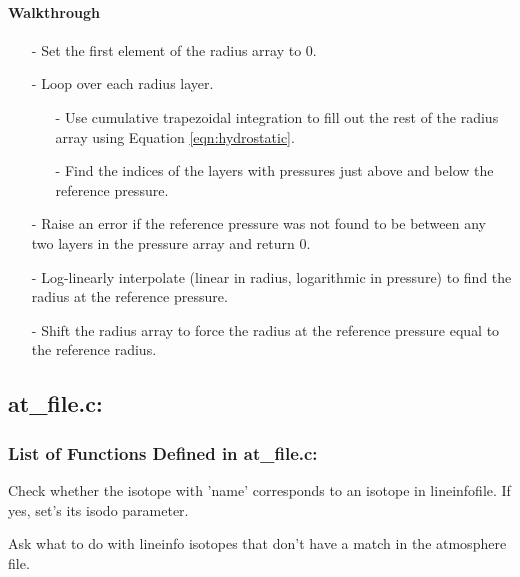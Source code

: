 \documentclass[letterpaper,12pt]{article}
\begin{document}
\paragraph{Walkthrough}
\begin{enumerate}[leftmargin=10pt, noitemsep, parsep=0pt, topsep=0ex]
\item[-] Set the first element of the radius array to 0.
\item[-] Loop over each radius layer.
\begin{enumerate}[leftmargin=10pt, noitemsep, parsep=0pt, topsep=0ex]
\item[-] Use cumulative trapezoidal integration to fill out the rest of the radius array using Equation \ref{eqn:hydrostatic}.
\item[-] Find the indices of the layers with pressures just above and below the reference pressure.
\end{enumerate}
\item[-] Raise an error if the reference pressure was not found to be between any two layers in the pressure array and return 0.
\item[-] Log-linearly interpolate (linear in radius, logarithmic in pressure) to find the radius at the reference pressure.
\item[-] Shift the radius array to force the radius at the reference pressure equal to the reference radius.
\end{enumerate}

\newpage
\subsection{at\_file.c:}
\subsubsection{List of Functions Defined in at\_file.c:}
Check whether the isotope with 'name' corresponds to an isotope in
lineinfofile. If yes, set's its isodo parameter. \newline

Ask what to do with lineinfo isotopes that don't have a match in 
the atmosphere file. \newline
\end{document}
